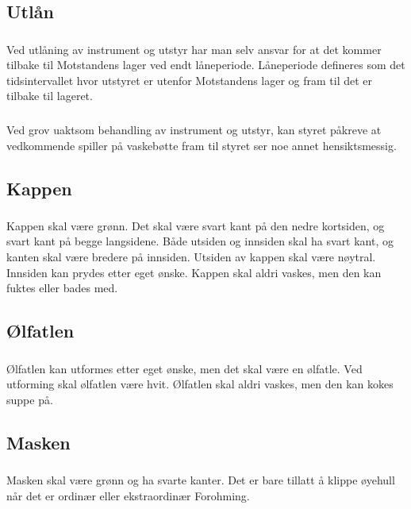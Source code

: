 \documentclass{article}
\newenvironment{statute}[1][]
    {
        \titleformat{\subsubsection}[runin]{\normalfont}{\hspace{1pt}\textit{\S\hspace{5pt}\thesubsubsection}}{0pt}{\rule{4pt}{0pt}}{}
        \subsubsection{}#1
        \begin{minipage}[t]{0.89\linewidth}
    }
    {
        \end{minipage}
        
        \ignorespacesafterend
    }
\begin{document}
        \subsection{Utlån}
                \begin{statute}
                    Ved utlåning av instrument og utstyr har man selv ansvar for at det kommer tilbake til Motstandens lager ved endt låneperiode. Låneperiode defineres som det tidsintervallet hvor utstyret er utenfor Motstandens lager og fram til det er tilbake til lageret.
                \end{statute}
                \begin{statute}
                    Ved grov uaktsom behandling av instrument og utstyr, kan styret påkreve at vedkommende spiller på vaskebøtte fram til styret ser noe annet hensiktsmessig. 
                \end{statute}

            
        \subsection{Kappen}
                \begin{statute}
                    Kappen skal være grønn. Det skal være svart kant på den nedre kortsiden, og svart kant på begge langsidene. Både utsiden og innsiden skal ha svart kant, og kanten skal være bredere på innsiden. Utsiden av kappen skal være nøytral. Innsiden kan prydes etter eget ønske. Kappen skal aldri vaskes, men den kan fuktes eller bades med.
                \end{statute}

        \subsection{Ølfatlen}
            \begin{statute}
                Ølfatlen kan utformes etter eget ønske, men det skal være en ølfatle. Ved utforming skal ølfatlen være hvit. Ølfatlen skal aldri vaskes, men den kan kokes suppe på.
            \end{statute}
            
        \subsection{Masken}
            \begin{statute}
                Masken skal være grønn og ha svarte kanter. Det er bare tillatt å klippe øyehull når det er ordinær eller ekstraordinær Forohming.
            \end{statute}
           
\end{document}
